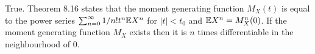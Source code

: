 
True. Theorem 8.16 states that the moment generating function $ M_{X} (t)$ is equal to the power
series $ \sum_{n=0}^{\infty} 1/n! t^{n} \mathbb{E} X^{n} $ for $ |t| < t_0$ and $ \mathbb{E} X^{n} = M_{X}^{n} (0)$.
If the moment generating function $ M_{X} $ exists then it is $ n$ times differentiable in the
neighbourhood of $ 0$.
